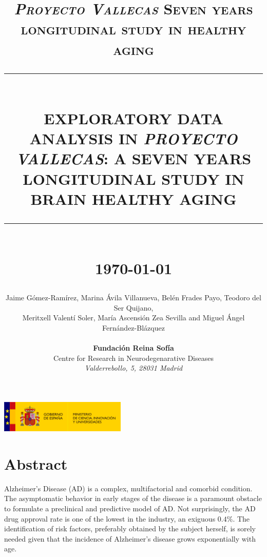\documentclass[11pt]{article}
\theoremstyle{definition}
\theoremstyle{remark}
\newcommand{\HRule}[1]{\rule{\linewidth}{#1}}
\begin{document}

\title{ \normalsize \textsc{\emph{Proyecto Vallecas} Seven years longitudinal study in healthy aging}
    \\ [2.0cm]
    \HRule{0.5pt} \\
    \LARGE \textbf{\uppercase{Exploratory Data Analysis in \emph{Proyecto Vallecas}: a seven years longitudinal study in brain healthy aging}}
    \HRule{2pt} \\ [0.5cm]
    \normalsize \today \vspace*{5\baselineskip}}

\date{ }
\author{
    Jaime G\'omez-Ram\'irez, Marina \'Avila Villanueva, Bel\'en Frades Payo, Teodoro del Ser Quijano,\\ Meritxell Valent\'i Soler, María Ascensi\'on Zea Sevilla and Miguel \'Angel Fern\'andez-Bl\'azquez   \\  \\
    \textbf{\large{Fundaci\'on Reina Sof\'ia}} \\
    Centre for Research in Neurodegenarative Diseases
    \\ \emph{Valderrebollo, 5, 28031 Madrid}
 }

\maketitle
\begin{center}
\includegraphics[width = 60mm]{figures/logo_mciu.png}
\end{center}
\newpage
\tableofcontents
\newpage

\sectionfont{\scshape}



\section*{Abstract}
Alzheimer's Disease (AD) is a complex, multifactorial and comorbid condition. The asymptomatic behavior in early stages of the disease is a paramount obstacle to formulate a preclinical and predictive model of AD. Not surprisingly, the AD drug approval rate is one of the lowest in the industry, an exiguous $0.4\%$. The identification of risk factors, preferably obtained by the subject herself, is sorely needed given that the incidence of Alzheimer’s disease grows exponentially with age. 
\end{document}
